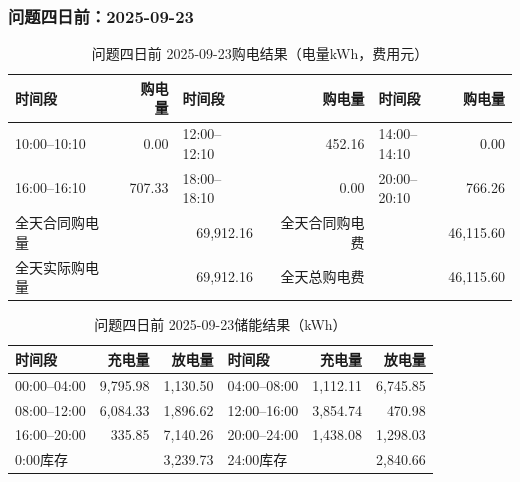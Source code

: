 \par\medskip
\par\noindent\begin{minipage}{\textwidth}
\subsubsection*{问题四日前：2025-09-23}
\begin{table}[H]\centering\small\setlength{\tabcolsep}{4pt}\caption{问题四日前 2025-09-23购电结果（电量kWh，费用元）}
\begin{tabular}{lr lr lr}\toprule
时间段 & 购电量 & 时间段 & 购电量 & 时间段 & 购电量\\\midrule
10:00--10:10 & 0.00 & 12:00--12:10 & 452.16 & 14:00--14:10 & 0.00\\
16:00--16:10 & 707.33 & 18:00--18:10 & 0.00 & 20:00--20:10 & 766.26\\
\midrule
全天合同购电量 & \multicolumn{2}{r}{69,912.16} & 全天合同购电费 & \multicolumn{2}{r}{46,115.60}\\
全天实际购电量 & \multicolumn{2}{r}{69,912.16} & 全天总购电费 & \multicolumn{2}{r}{46,115.60}\\
\bottomrule\end{tabular}\end{table}
\begin{table}[H]\centering\small\setlength{\tabcolsep}{4pt}\caption{问题四日前 2025-09-23储能结果（kWh）}
\begin{tabular}{lrr lrr}\toprule
时间段 & 充电量 & 放电量 & 时间段 & 充电量 & 放电量\\\midrule
00:00--04:00 & 9,795.98 & 1,130.50 & 04:00--08:00 & 1,112.11 & 6,745.85\\
08:00--12:00 & 6,084.33 & 1,896.62 & 12:00--16:00 & 3,854.74 & 470.98\\
16:00--20:00 & 335.85 & 7,140.26 & 20:00--24:00 & 1,438.08 & 1,298.03\\
\midrule
0:00库存 & \multicolumn{2}{r}{3,239.73} & 24:00库存 & \multicolumn{2}{r}{2,840.66}\\
\bottomrule\end{tabular}\end{table}
\end{minipage}\par

